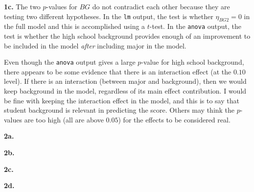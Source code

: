 \documentclass[12pt]{article}
\begin{document}
\noindent \textbf{1c.} The two $p$-values for $BG$ do not contradict each other because they are testing two different hypotheses. In the \texttt{lm} output, the test is whether $\eta_{BG2}=0$ in the full model and this is accomplished using a $t$-test. In the \texttt{anova} output, the test is whether the high school background provides enough of an improvement to be included in the model \emph{after} including major in the model.
\bigskip

\noindent Even though the \texttt{anova} output gives a large $p$-value for high school background, there appears to be some evidence that there is an interaction effect (at the $0.10$ level). If there is an interaction (between major and background), then we would keep background in the model, regardless of its main effect contribution. I would be fine with keeping the interaction effect in the model, and this is to say that student background is relevant in predicting the score. Others may think the $p$-values are too high (all are above $0.05$) for the effects to be considered real.
\bigskip
\bigskip
\bigskip

\noindent \textbf{2a.}

\noindent \textbf{2b.}

\noindent \textbf{2c.}

\noindent \textbf{2d.}
\end{document}
